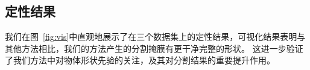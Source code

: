 

\subsection{定性结果} \label{sec:res2}
我们在图~\ref{fig:vis}中直观地展示了在三个数据集上的定性结果，可视化结果表明与其他方法相比，我们的方法产生的分割掩膜有更干净完整的形状。
这进一步验证了我们方法中对物体形状先验的关注，及其对分割结果的重要提升作用。

